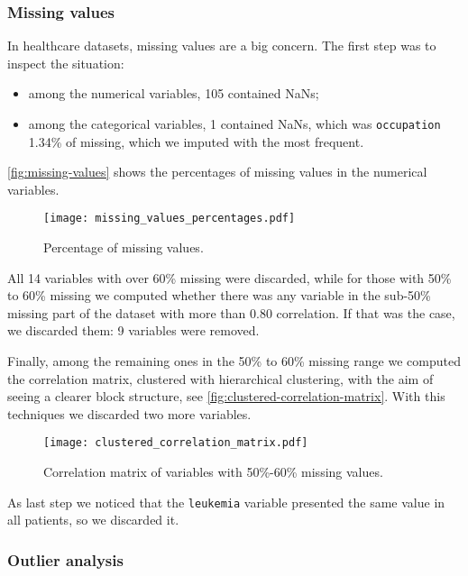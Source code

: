 \subsubsection{Missing values}

In healthcare datasets, missing values are a big concern. The first step was to inspect the situation:
\begin{itemize}
    \item among the numerical variables, 105 contained NaNs;
    \item among the categorical variables, 1 contained NaNs, which was \texttt{occupation} 1.34\% of missing, which we imputed with the most frequent.
\end{itemize}

\autoref{fig:missing-values} shows the percentages of missing values in the numerical variables.

\begin{figure}[htpb]
    \centering
    \texttt{[image: missing\_values\_percentages.pdf]}
    \caption{Percentage of missing values.}
    \label{fig:missing-values}
\end{figure}

All 14 variables with over 60\% missing were discarded, while for those with 50\% to 60\% missing we computed whether there was any variable in the sub-50\% missing part of the dataset with more than 0.80 correlation. If that was the case, we discarded them: 9 variables were removed.

Finally, among the remaining ones in the 50\% to 60\% missing range we computed the correlation matrix, clustered with hierarchical clustering, with the aim of seeing a clearer block structure, see \autoref{fig:clustered-correlation-matrix}. With this techniques we discarded two more variables.

\begin{figure}[htpb]
    \centering
    \texttt{[image: clustered\_correlation\_matrix.pdf]}
    \caption{Correlation matrix of variables with 50\%-60\% missing values.}
    \label{fig:clustered-correlation-matrix}
\end{figure}

As last step we noticed that the \texttt{leukemia} variable presented the same value in all patients, so we discarded it.

\subsubsection{Outlier analysis}\label{sec:outlier-analysis}

